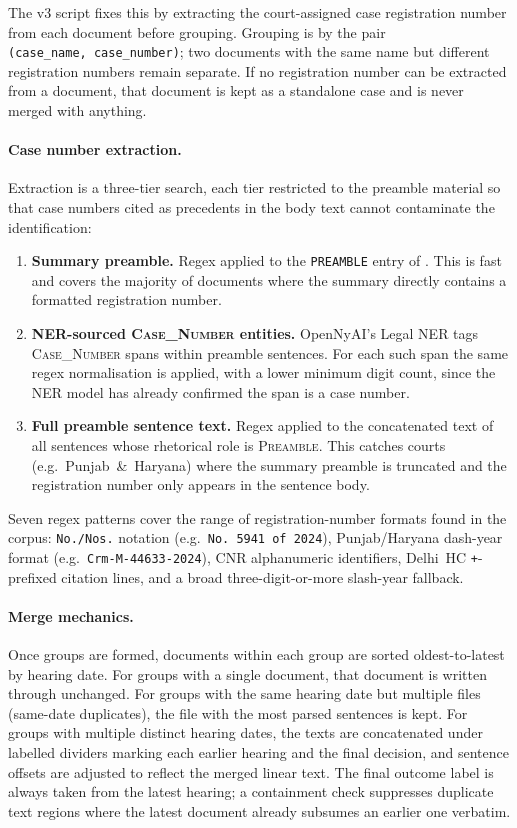 The v3 script fixes this by extracting the court-assigned case registration
number from each document before grouping. Grouping is by the pair
\texttt{(case\_name,\ case\_number)}; two documents with the same name but
different registration numbers remain separate. If no registration number can be
extracted from a document, that document is kept as a standalone case and is
never merged with anything.

\paragraph{Case number extraction.}
Extraction is a three-tier search, each tier restricted to the preamble material
so that case numbers cited as precedents in the body text cannot contaminate the
identification:

\begin{enumerate}
  \item \textbf{Summary preamble.} Regex applied to the
    \texttt{PREAMBLE} entry of . This is fast and covers the
    majority of documents where the summary directly contains a formatted
    registration number.
  \item \textbf{NER-sourced \textsc{Case\_Number} entities.} OpenNyAI's Legal
    NER tags \textsc{Case\_Number} spans within preamble sentences. For each
    such span the same regex normalisation is applied, with a lower minimum digit
    count, since the NER model has already confirmed the span is a case number.
  \item \textbf{Full preamble sentence text.} Regex applied to the concatenated
    text of all sentences whose rhetorical role is \textsc{Preamble}. This
    catches courts (e.g.\ Punjab~\&~Haryana) where the summary preamble is
    truncated and the registration number only appears in the sentence body.
\end{enumerate}

Seven regex patterns cover the range of registration-number formats found in the
corpus: \texttt{No./Nos.} notation (e.g.\ \texttt{No.~5941 of~2024}),
Punjab/Haryana dash-year format (e.g.\ \texttt{Crm-M-44633-2024}), CNR
alphanumeric identifiers, Delhi~HC \texttt{+}-prefixed citation lines, and a
broad three-digit-or-more slash-year fallback.

\paragraph{Merge mechanics.}
Once groups are formed, documents within each group are sorted oldest-to-latest
by hearing date. For groups with a single document, that document is written
through unchanged. For groups with the same hearing date but multiple files
(same-date duplicates), the file with the most parsed sentences is kept. For
groups with multiple distinct hearing dates, the texts are concatenated under
labelled dividers marking each earlier hearing and the final decision, and
sentence offsets are adjusted to reflect the merged linear text. The final
outcome label is always taken from the latest hearing; a containment check
suppresses duplicate text regions where the latest document already subsumes an
earlier one verbatim.

